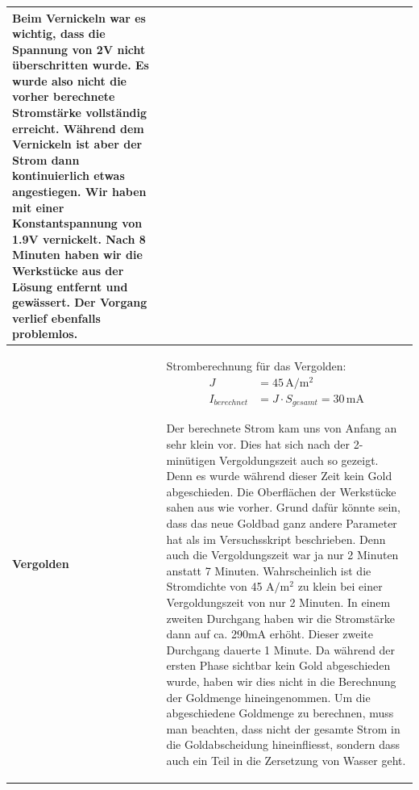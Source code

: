 \begin{longtable}{p{3cm}p{14cm}}
    Beim Vernickeln war es wichtig, dass die Spannung von 2V nicht überschritten wurde. Es wurde also nicht die vorher berechnete Stromstärke vollständig erreicht. Während dem Vernickeln ist aber der Strom dann kontinuierlich etwas angestiegen. Wir haben mit einer Konstantspannung von 1.9V vernickelt. Nach 8 Minuten haben wir die Werkstücke aus der Lösung entfernt und gewässert. Der Vorgang verlief ebenfalls problemlos.\\
    \hline
    
    \textbf{Vergolden}
    & Stromberechnung für das Vergolden:
    $$\begin{aligned}
        J &= 45 \, \mathrm{A/m^2}\\
        I_{berechnet} &= J \cdot S_{gesamt} = 30 \, \mathrm{mA}
    \end{aligned}$$
    
    Der berechnete Strom kam uns von Anfang an sehr klein vor. Dies hat sich nach der 2-minütigen Vergoldungszeit auch so gezeigt. Denn es wurde während dieser Zeit kein Gold abgeschieden. Die Oberflächen der Werkstücke sahen aus wie vorher. Grund dafür könnte sein, dass das neue Goldbad ganz andere Parameter hat als im Versuchsskript beschrieben. Denn auch die Vergoldungszeit war ja nur 2 Minuten anstatt 7 Minuten. Wahrscheinlich ist die Stromdichte von 45 $\mathrm{A/m^2}$ zu klein bei einer Vergoldungszeit von nur 2 Minuten.\newline
    In einem zweiten Durchgang haben wir die Stromstärke dann auf ca. 290mA erhöht. Dieser zweite Durchgang dauerte 1 Minute. Da während der ersten Phase sichtbar kein Gold abgeschieden wurde, haben wir dies nicht in die Berechnung der Goldmenge hineingenommen.\newline
    Um die abgeschiedene Goldmenge zu berechnen, muss man beachten, dass nicht der gesamte Strom in die Goldabscheidung hineinfliesst, sondern dass auch ein Teil in die Zersetzung von Wasser geht.
\end{longtable}
\newpage

